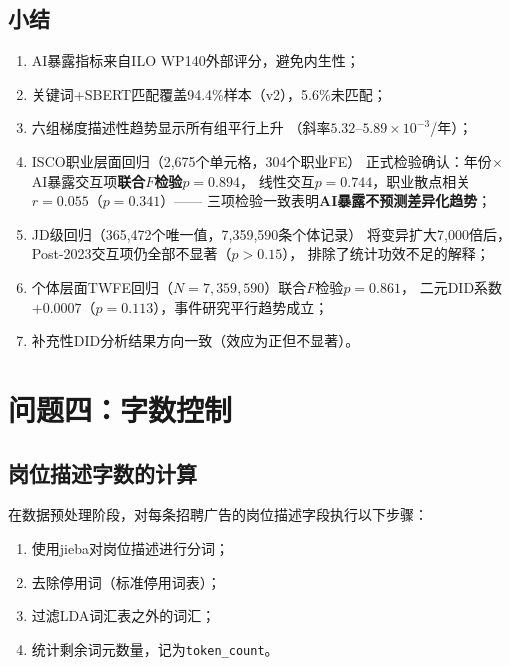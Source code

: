 \documentclass[12pt,a4paper]{ctexart}
\begin{document}
\subsection{小结}

\begin{enumerate}
\item AI暴露指标来自ILO WP140外部评分，避免内生性；
\item 关键词+SBERT匹配覆盖94.4\%样本（v2），5.6\%未匹配；
\item 六组梯度描述性趋势显示所有组平行上升
      （斜率$5.32$--$5.89 \times 10^{-3}$/年）；
\item ISCO职业层面回归（2,675个单元格，304个职业FE）
      正式检验确认：年份$\times$AI暴露交互项\textbf{联合$F$检验$p = 0.894$}，
      线性交互$p = 0.744$，职业散点相关$r = 0.055$（$p = 0.341$）——
      三项检验一致表明\textbf{AI暴露不预测差异化趋势}；
\item JD级回归（365,472个唯一值，7,359,590条个体记录）
      将变异扩大7,000倍后，Post-2023交互项仍全部不显著（$p>0.15$），
      排除了统计功效不足的解释；
\item 个体层面TWFE回归（$N=7{,}359{,}590$）联合$F$检验$p=0.861$，
      二元DID系数$+0.0007$（$p=0.113$），事件研究平行趋势成立；
\item 补充性DID分析结果方向一致（效应为正但不显著）。
\end{enumerate}


\section{问题四：字数控制}
\label{sec:token_control}

\subsection{岗位描述字数的计算}

在数据预处理阶段，对每条招聘广告的岗位描述字段执行以下步骤：
\begin{enumerate}
\item 使用jieba对岗位描述进行分词；
\item 去除停用词（标准停用词表）；
\item 过滤LDA词汇表之外的词汇；
\item 统计剩余词元数量，记为\texttt{token\_count}。
\end{enumerate}
\end{document}
